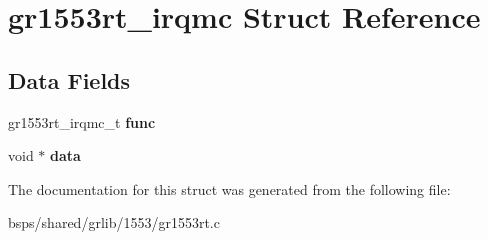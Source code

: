 \hypertarget{structgr1553rt__irqmc}{}\section{gr1553rt\+\_\+irqmc Struct Reference}
\label{structgr1553rt__irqmc}
\subsection*{Data Fields}
\begin{DoxyCompactItemize}
\item 
\mbox{\label{structgr1553rt__irqmc_ad5ca2cd9d06403cc33fb53959342e231}} 
gr1553rt\+\_\+irqmc\+\_\+t {\bfseries func}
\item 
\mbox{\label{structgr1553rt__irqmc_a80b6a35eaaee9872fe85679eccd76f11}} 
void $\ast$ {\bfseries data}
\end{DoxyCompactItemize}


The documentation for this struct was generated from the following file\+:\begin{DoxyCompactItemize}
\item 
bsps/shared/grlib/1553/gr1553rt.\+c\end{DoxyCompactItemize}
